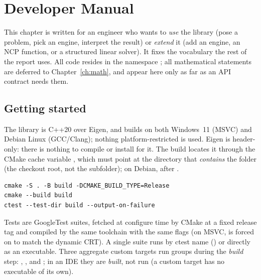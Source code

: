 \chapter{Developer Manual}
\label{ch:manual}

This chapter is written for an engineer who wants to \emph{use} the library
(pose a problem, pick an engine, interpret the result) or \emph{extend} it
(add an engine, an NCP function, or a structured linear solver). It fixes the
vocabulary the rest of the report uses. All code resides in the namespace
; all mathematical statements are deferred to
Chapter~\ref{ch:math}, and appear here only as far as an API contract
needs them.

\section{Getting started}
\label{sec:getting-started}

The library is C++20 over Eigen, and builds on both Windows~11 (MSVC) and
Debian Linux (GCC/Clang); nothing platform-restricted is used. Eigen is
header-only: there is nothing to compile or install for it. The build locates
it through the CMake cache variable , which must
point at the directory that \emph{contains} the  folder (the
checkout root, not the  subfolder); on Debian,
 after .

\begin{lstlisting}
cmake -S . -B build -DCMAKE_BUILD_TYPE=Release
cmake --build build
ctest --test-dir build --output-on-failure
\end{lstlisting}

Tests are GoogleTest suites, fetched at configure time by CMake
 at a fixed release tag and compiled by the same
toolchain with the same flags (on MSVC,  is
forced on to match the dynamic CRT). A single suite runs by ctest name
() or directly as an executable. Three
aggregate custom targets run groups during the \emph{build} step:
, , and
; in an IDE they are \emph{built}, not run (a
custom target has no executable of its own).

